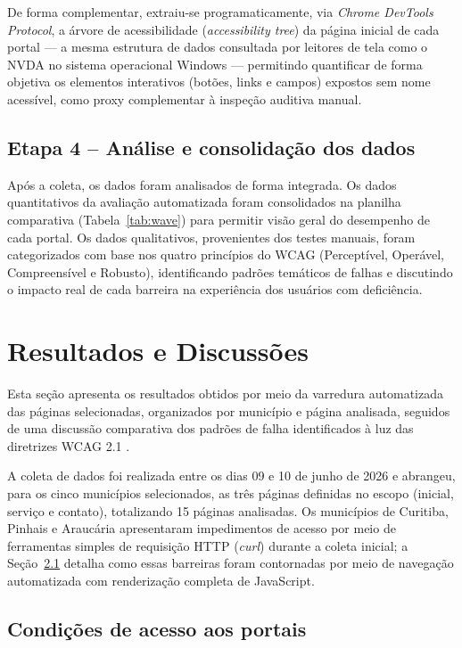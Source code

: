 \documentclass[brazil]{ifpr-pinhais}
\begin{document}
De forma complementar, extraiu-se programaticamente, via \textit{Chrome DevTools Protocol}, a árvore de acessibilidade (\textit{accessibility tree}) da página inicial de cada portal --- a mesma estrutura de dados consultada por leitores de tela como o NVDA no sistema operacional Windows --- permitindo quantificar de forma objetiva os elementos interativos (botões, links e campos) expostos sem nome acessível, como proxy complementar à inspeção auditiva manual.

\section{Etapa 4 -- Análise e consolidação dos dados}

Após a coleta, os dados foram analisados de forma integrada. Os dados quantitativos da avaliação automatizada foram consolidados na planilha comparativa (Tabela~\ref{tab:wave}) para permitir visão geral do desempenho de cada portal. Os dados qualitativos, provenientes dos testes manuais, foram categorizados com base nos quatro princípios do WCAG (Perceptível, Operável, Compreensível e Robusto), identificando padrões temáticos de falhas e discutindo o impacto real de cada barreira na experiência dos usuários com deficiência.

\chapter{Resultados e Discussões}

Esta seção apresenta os resultados obtidos por meio da varredura automatizada das páginas selecionadas, organizados por município e página analisada, seguidos de uma discussão comparativa dos padrões de falha identificados à luz das diretrizes WCAG 2.1 \cite{w3c2018wcag}.

A coleta de dados foi realizada entre os dias 09 e 10 de junho de 2026 e abrangeu, para os cinco municípios selecionados, as três páginas definidas no escopo (inicial, serviço e contato), totalizando 15 páginas analisadas. Os municípios de Curitiba, Pinhais e Araucária apresentaram impedimentos de acesso por meio de ferramentas simples de requisição HTTP (\textit{curl}) durante a coleta inicial; a Seção~\ref{sec:acesso} detalha como essas barreiras foram contornadas por meio de navegação automatizada com renderização completa de JavaScript.

\section{Condições de acesso aos portais}
\label{sec:acesso}
\end{document}
